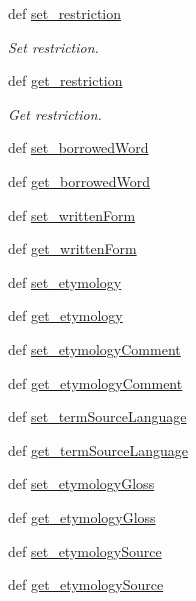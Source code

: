 \begin{DoxyCompactItemize}
def \hyperlink{classlmf_1_1src_1_1core_1_1statement_1_1_statement_a66ff1951ce0a2b839f2ab4c1f5447426}{set\+\_\+restriction}
\begin{DoxyCompactList}\small\item\em Set restriction. \end{DoxyCompactList}\item 
def \hyperlink{classlmf_1_1src_1_1core_1_1statement_1_1_statement_ab85c880e48d2123caaed25d78bd32c76}{get\+\_\+restriction}
\begin{DoxyCompactList}\small\item\em Get restriction. \end{DoxyCompactList}\item 
def \hyperlink{classlmf_1_1src_1_1core_1_1statement_1_1_statement_abf1eb5ffc95de2aedde3fbc57ba9a795}{set\+\_\+borrowed\+Word}
\item 
def \hyperlink{classlmf_1_1src_1_1core_1_1statement_1_1_statement_a4d211071167d9b64b90a8863bccdba47}{get\+\_\+borrowed\+Word}
\item 
def \hyperlink{classlmf_1_1src_1_1core_1_1statement_1_1_statement_a0a666409b4347a2e1fc306c776403644}{set\+\_\+written\+Form}
\item 
def \hyperlink{classlmf_1_1src_1_1core_1_1statement_1_1_statement_ad76ee83090f177477973b3318f14e4e3}{get\+\_\+written\+Form}
\item 
def \hyperlink{classlmf_1_1src_1_1core_1_1statement_1_1_statement_a77b0a232ce93b2cc0495ee63064e286d}{set\+\_\+etymology}
\item 
def \hyperlink{classlmf_1_1src_1_1core_1_1statement_1_1_statement_a680c28452d3c0e819db589479e364441}{get\+\_\+etymology}
\item 
def \hyperlink{classlmf_1_1src_1_1core_1_1statement_1_1_statement_abcd99a1f9adf0b86fe0648d3d5d0c745}{set\+\_\+etymology\+Comment}
\item 
def \hyperlink{classlmf_1_1src_1_1core_1_1statement_1_1_statement_ad64f4d82e8aac9ca2e106673195adef2}{get\+\_\+etymology\+Comment}
\item 
def \hyperlink{classlmf_1_1src_1_1core_1_1statement_1_1_statement_a2559e6c441e8b9c1276ea7f7ae765f1d}{set\+\_\+term\+Source\+Language}
\item 
def \hyperlink{classlmf_1_1src_1_1core_1_1statement_1_1_statement_ab63acc79afef490f7e9c748c57452d9c}{get\+\_\+term\+Source\+Language}
\item 
def \hyperlink{classlmf_1_1src_1_1core_1_1statement_1_1_statement_ad5405bae6d97fb2a64ab75748c1122a5}{set\+\_\+etymology\+Gloss}
\item 
def \hyperlink{classlmf_1_1src_1_1core_1_1statement_1_1_statement_ade26b2eb6ee95396a9716030020e7b80}{get\+\_\+etymology\+Gloss}
\item 
def \hyperlink{classlmf_1_1src_1_1core_1_1statement_1_1_statement_a74132a7211362920d34c35ed423f24fb}{set\+\_\+etymology\+Source}
\item 
def \hyperlink{classlmf_1_1src_1_1core_1_1statement_1_1_statement_a4871b4a55077cb3c57b8b69ce9c9a00b}{get\+\_\+etymology\+Source}
\end{DoxyCompactItemize}
